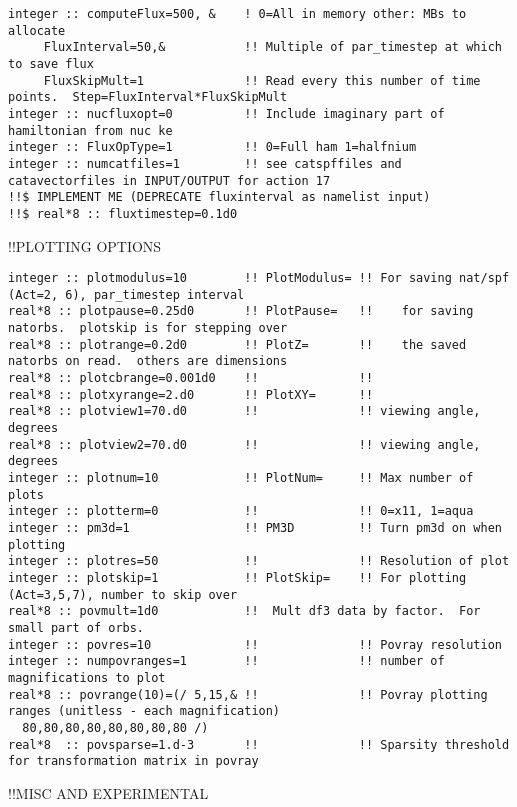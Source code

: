 \begin{verbatim}
integer :: computeFlux=500, &    ! 0=All in memory other: MBs to allocate
     FluxInterval=50,&           !! Multiple of par_timestep at which to save flux
     FluxSkipMult=1              !! Read every this number of time points.  Step=FluxInterval*FluxSkipMult
integer :: nucfluxopt=0          !! Include imaginary part of hamiltonian from nuc ke 
integer :: FluxOpType=1          !! 0=Full ham 1=halfnium 
integer :: numcatfiles=1         !! see catspffiles and catavectorfiles in INPUT/OUTPUT for action 17
!!$ IMPLEMENT ME (DEPRECATE fluxinterval as namelist input) 
!!$ real*8 :: fluxtimestep=0.1d0
\end{verbatim}
!!{\large \quad PLOTTING OPTIONS }
\begin{verbatim}
integer :: plotmodulus=10        !! PlotModulus= !! For saving nat/spf (Act=2, 6), par_timestep interval
real*8 :: plotpause=0.25d0       !! PlotPause=   !!    for saving natorbs.  plotskip is for stepping over
real*8 :: plotrange=0.2d0        !! PlotZ=       !!    the saved natorbs on read.  others are dimensions
real*8 :: plotcbrange=0.001d0    !!              !!    
real*8 :: plotxyrange=2.d0       !! PlotXY=      !!    
real*8 :: plotview1=70.d0        !!              !! viewing angle, degrees
real*8 :: plotview2=70.d0        !!              !! viewing angle, degrees
integer :: plotnum=10            !! PlotNum=     !! Max number of plots
integer :: plotterm=0            !!              !! 0=x11, 1=aqua
integer :: pm3d=1                !! PM3D         !! Turn pm3d on when plotting
integer :: plotres=50            !!              !! Resolution of plot
integer :: plotskip=1            !! PlotSkip=    !! For plotting (Act=3,5,7), number to skip over
real*8 :: povmult=1d0            !!  Mult df3 data by factor.  For small part of orbs.
integer :: povres=10             !!              !! Povray resolution
integer :: numpovranges=1        !!              !! number of magnifications to plot
real*8 :: povrange(10)=(/ 5,15,& !!              !! Povray plotting ranges (unitless - each magnification)
  80,80,80,80,80,80,80,80 /)
real*8  :: povsparse=1.d-3       !!              !! Sparsity threshold for transformation matrix in povray
\end{verbatim}
!!{\large \quad MISC AND EXPERIMENTAL}
